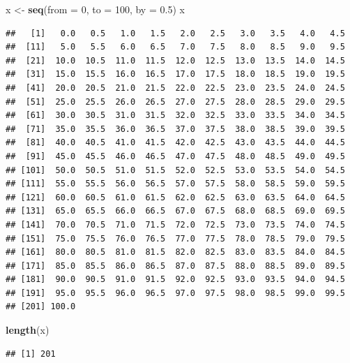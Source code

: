\documentclass[12pt,a4paper]{article}
\newenvironment{Shaded}{\begin{snugshade}}{\end{snugshade}}
\newcommand{\AttributeTok}[1]{\textcolor[rgb]{0.13,0.29,0.53}{#1}}
\newcommand{\DecValTok}[1]{\textcolor[rgb]{0.00,0.00,0.81}{#1}}
\newcommand{\FloatTok}[1]{\textcolor[rgb]{0.00,0.00,0.81}{#1}}
\newcommand{\FunctionTok}[1]{\textcolor[rgb]{0.13,0.29,0.53}{\textbf{#1}}}
\newcommand{\NormalTok}[1]{#1}
\newcommand{\OtherTok}[1]{\textcolor[rgb]{0.56,0.35,0.01}{#1}}
\begin{document}
\begin{Shaded}
\begin{Highlighting}[]
\NormalTok{    x }\OtherTok{\textless{}{-}} \FunctionTok{seq}\NormalTok{(}\AttributeTok{from =} \DecValTok{0}\NormalTok{, }\AttributeTok{to =} \DecValTok{100}\NormalTok{, }\AttributeTok{by =} \FloatTok{0.5}\NormalTok{)}
\NormalTok{    x}
\end{Highlighting}
\end{Shaded}

\begin{verbatim}
##   [1]   0.0   0.5   1.0   1.5   2.0   2.5   3.0   3.5   4.0   4.5
##  [11]   5.0   5.5   6.0   6.5   7.0   7.5   8.0   8.5   9.0   9.5
##  [21]  10.0  10.5  11.0  11.5  12.0  12.5  13.0  13.5  14.0  14.5
##  [31]  15.0  15.5  16.0  16.5  17.0  17.5  18.0  18.5  19.0  19.5
##  [41]  20.0  20.5  21.0  21.5  22.0  22.5  23.0  23.5  24.0  24.5
##  [51]  25.0  25.5  26.0  26.5  27.0  27.5  28.0  28.5  29.0  29.5
##  [61]  30.0  30.5  31.0  31.5  32.0  32.5  33.0  33.5  34.0  34.5
##  [71]  35.0  35.5  36.0  36.5  37.0  37.5  38.0  38.5  39.0  39.5
##  [81]  40.0  40.5  41.0  41.5  42.0  42.5  43.0  43.5  44.0  44.5
##  [91]  45.0  45.5  46.0  46.5  47.0  47.5  48.0  48.5  49.0  49.5
## [101]  50.0  50.5  51.0  51.5  52.0  52.5  53.0  53.5  54.0  54.5
## [111]  55.0  55.5  56.0  56.5  57.0  57.5  58.0  58.5  59.0  59.5
## [121]  60.0  60.5  61.0  61.5  62.0  62.5  63.0  63.5  64.0  64.5
## [131]  65.0  65.5  66.0  66.5  67.0  67.5  68.0  68.5  69.0  69.5
## [141]  70.0  70.5  71.0  71.5  72.0  72.5  73.0  73.5  74.0  74.5
## [151]  75.0  75.5  76.0  76.5  77.0  77.5  78.0  78.5  79.0  79.5
## [161]  80.0  80.5  81.0  81.5  82.0  82.5  83.0  83.5  84.0  84.5
## [171]  85.0  85.5  86.0  86.5  87.0  87.5  88.0  88.5  89.0  89.5
## [181]  90.0  90.5  91.0  91.5  92.0  92.5  93.0  93.5  94.0  94.5
## [191]  95.0  95.5  96.0  96.5  97.0  97.5  98.0  98.5  99.0  99.5
## [201] 100.0
\end{verbatim}

\begin{Shaded}
\begin{Highlighting}[]
    \FunctionTok{length}\NormalTok{(x)}
\end{Highlighting}
\end{Shaded}

\begin{verbatim}
## [1] 201
\end{verbatim}

\vspace{0.5cm}
\end{document}
